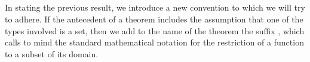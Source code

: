 \begin{code}
\AgdaSpace{}%
\AgdaSpace{}%
\AgdaSymbol{(}\AgdaSpace{}%
\AgdaSymbol{)}\<%
\\
%
\\[\AgdaEmptyExtraSkip]%
%
\>[2]\AgdaSpace{}%
\AgdaSymbol{:}\AgdaSpace{}%
\AgdaSpace{}%
\AgdaSpace{}%
\<%
\\
%
\>[2]\AgdaSpace{}%
\AgdaSymbol{=}\AgdaSpace{}%
\AgdaSpace{}%
\AgdaSpace{}%
\AgdaSpace{}%
\<%
\\
%
\\[\AgdaEmptyExtraSkip]%
%
\>[2]\AgdaSpace{}%
\AgdaSymbol{:}\AgdaSpace{}%
\AgdaSpace{}%
\AgdaSpace{}%
\AgdaSpace{}%
\AgdaSymbol{(}\AgdaSpace{}%
\AgdaSpace{}%
\AgdaSymbol{)}\AgdaSpace{}%
\AgdaFunction{,}\AgdaSpace{}%
\AgdaSymbol{(}\AgdaSpace{}%
\AgdaSpace{}%
\AgdaSpace{}%
\AgdaSpace{}%
\AgdaSpace{}%
\AgdaSpace{}%
\AgdaSpace{}%
\AgdaSymbol{)}\AgdaSpace{}%
\AgdaSpace{}%
\AgdaSymbol{)}\AgdaSpace{}%
\AgdaSpace{}%
\<%
\\
%
\>[2]\AgdaSpace{}%
\AgdaSymbol{=}\AgdaSpace{}%
\AgdaSpace{}%
\AgdaOperator{\AgdaInductiveConstructor{,}}\AgdaSpace{}%
\AgdaSpace{}%
\AgdaSymbol{(}\AgdaSpace{}%
\AgdaSymbol{)}\AgdaSpace{}%
\AgdaSpace{}%
\AgdaSymbol{(}\AgdaSpace{}%
\AgdaSpace{}%
\AgdaSpace{}%
\AgdaSpace{}%
\AgdaSpace{}%
\AgdaSpace{}%
\AgdaSpace{}%
\AgdaSymbol{)}\AgdaSpace{}%
\AgdaSpace{}%
\AgdaSymbol{)}\AgdaSpace{}%
\<%
\\
%
\\[\AgdaEmptyExtraSkip]%
%
\>[2]\AgdaSpace{}%
\AgdaSymbol{:}\AgdaSpace{}%
\AgdaSpace{}%
\AgdaOperator{\AgdaInductiveConstructor{,}}\AgdaSpace{}%
\AgdaSpace{}%
\AgdaSpace{}%
\AgdaSpace{}%
\AgdaOperator{\AgdaInductiveConstructor{,}}\AgdaSpace{}%
\<%
\\
%
\>[2]\AgdaSpace{}%
\AgdaSymbol{=}\AgdaSpace{}%
\AgdaSpace{}%
\<%
\end{code}
\ccpad
In stating the previous result, we introduce a new convention to which we will try to adhere. If the antecedent of a theorem includes the assumption that one of the types involved is a set, then we add to the name of the theorem the suffix , which calls to mind the standard mathematical notation for the restriction of a function to a subset of its domain.

